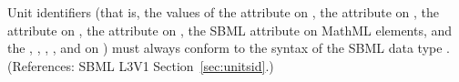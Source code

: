 Unit identifiers (that is, the values of the  attribute on
\UnitDefinition, the  attribute on \Compartment, the
 attribute on \Parameter, the  attribute
on \Species, the SBML  attribute on MathML 
elements, and the , ,
, ,  and
 on \Model) must always conform to the syntax of the
SBML data type .  (References: SBML L3V1
Section~\ref{sec:unitsid}.)
